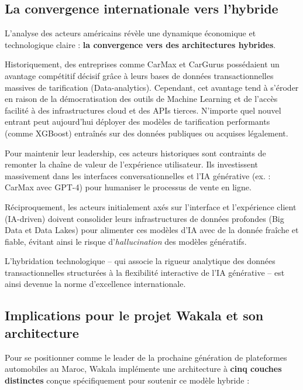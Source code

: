 \documentclass[11pt,a4paper]{article}
\begin{document}
\subsection{La convergence internationale vers l'hybride}
L'analyse des acteurs américains révèle une dynamique économique et technologique claire : \textbf{la convergence vers des architectures hybrides}.

Historiquement, des entreprises comme CarMax et CarGurus possédaient un avantage compétitif décisif grâce à leurs bases de données transactionnelles massives de tarification (Data-analytics). Cependant, cet avantage tend à s'éroder en raison de la démocratisation des outils de Machine Learning et de l'accès facilité à des infrastructures cloud et des APIs tierces. N'importe quel nouvel entrant peut aujourd'hui déployer des modèles de tarification performants (comme XGBoost) entraînés sur des données publiques ou acquises légalement.

Pour maintenir leur leadership, ces acteurs historiques sont contraints de remonter la chaîne de valeur de l'expérience utilisateur. Ils investissent massivement dans les interfaces conversationnelles et l'IA générative (ex. : CarMax avec GPT-4) pour humaniser le processus de vente en ligne.

Réciproquement, les acteurs initialement axés sur l'interface et l'expérience client (IA-driven) doivent consolider leurs infrastructures de données profondes (Big Data et Data Lakes) pour alimenter ces modèles d'IA avec de la donnée fraîche et fiable, évitant ainsi le risque d'\textit{hallucination} des modèles génératifs.

L'hybridation technologique -- qui associe la rigueur analytique des données transactionnelles structurées à la flexibilité interactive de l'IA générative -- est ainsi devenue la norme d'excellence internationale.

\subsection{Implications pour le projet Wakala et son architecture}
Pour se positionner comme le leader de la prochaine génération de plateformes automobiles au Maroc, Wakala implémente une architecture à \textbf{cinq couches distinctes} conçue spécifiquement pour soutenir ce modèle hybride :
\end{document}
